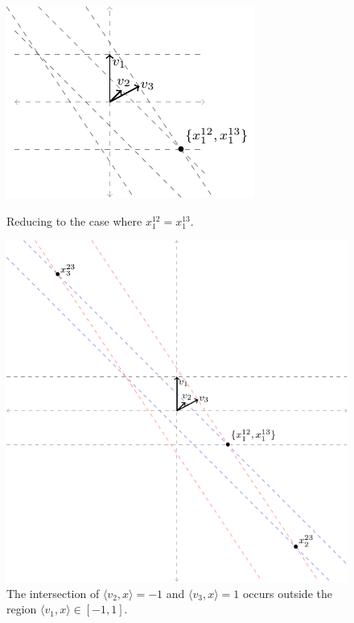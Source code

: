 \documentclass[anon]{colt2020} %
\newcommand{\inprod}[2]{\langle #1, #2 \rangle}%
\begin{document}
\begin{figure}
		\begin{minipage}{0.4\linewidth}
		\centering
		\includegraphics[width=0.9\linewidth]{tikz/qp-intuition-contradiction.pdf}
		\caption{Reducing to the case where $x^{12}_1 = x^{13}_1$.}
		\label{fig:qp-line-intersect-contradiction}
	\end{minipage}
\hfill
	\begin{minipage}{0.59\linewidth}
	\centering
	\includegraphics[width=0.9\linewidth]{tikz/qp-intuition-contradiction-with-intersection.pdf}
	\caption{The intersection of $\inprod{v_2}{x} = -1$ and $\inprod{v_3}{x} = 1$ occurs outside the region $\inprod{v_1}{x} \in [-1,1]$.}
	\label{fig:qp-line-intersect-contradiction-with-intersection}
	\end{minipage}
\end{figure}
\end{document}
